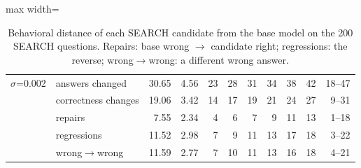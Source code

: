 \begin{table}[t]
\begin{adjustbox}{max width=\linewidth}
\begin{tabular}{llrrrrrrrrr}
\midrule
$\sigma$=0.002 & answers changed & 30.65 & 4.56 & 23 & 28 & 31 & 34 & 38 & 42 & 18--47 \\
 & correctness changes & 19.06 & 3.42 & 14 & 17 & 19 & 21 & 24 & 27 & 9--31 \\
 & repairs & 7.55 & 2.34 & 4 & 6 & 7 & 9 & 11 & 13 & 1--18 \\
 & regressions & 11.52 & 2.98 & 7 & 9 & 11 & 13 & 17 & 18 & 3--22 \\
 & wrong$\to$wrong & 11.59 & 2.77 & 7 & 10 & 11 & 13 & 16 & 18 & 4--21 \\
\bottomrule
\end{tabular}
\end{adjustbox}
\caption{Behavioral distance of each SEARCH candidate from the base model on the 200 SEARCH questions. Repairs: base wrong $\to$ candidate right; regressions: the reverse; wrong$\to$wrong: a different wrong answer.}
\label{tab:behavioral-distance}
\end{table}
